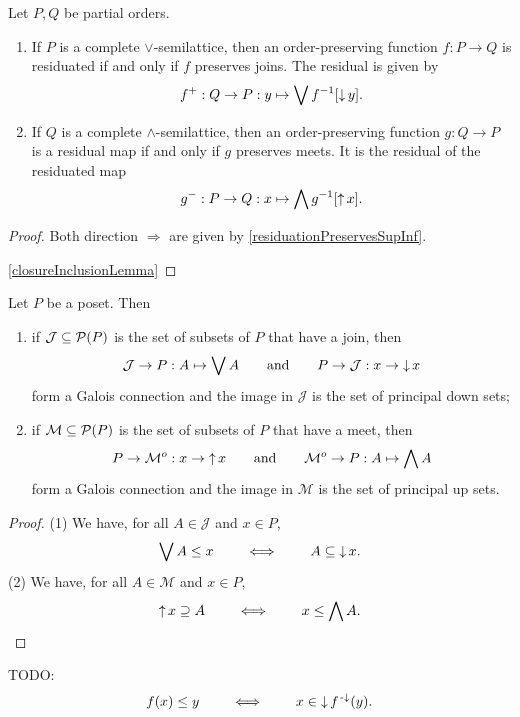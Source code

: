 \begin{proposition} \label{GaloisConnectionLatticePreservation}
Let $P, Q$ be partial orders.
\begin{enumerate}
\item If $P$ is a complete $\vee$-semilattice, then an order-preserving function $f: P\to Q$ is residuated \textup{if and only if} $f$ preserves joins. The residual is given by
\[ f^+: Q\to P: y\mapsto \bigvee f^{-1}[\operatorname{\downarrow} y]. \]
\item If $Q$ is a complete $\wedge$-semilattice, then an order-preserving function $g: Q\to P$ is a residual map \textup{if and only if} $g$ preserves meets. It is the residual of the residuated map
\[ g^-: P\to Q: x\mapsto \bigwedge g^{-1}[\operatorname{\uparrow} x]. \]
\end{enumerate}
\end{proposition}
\begin{proof}
Both direction $\Rightarrow$ are given by \ref{residuationPreservesSupInf}.

\ref{closureInclusionLemma}
\end{proof}



\begin{proposition} \label{upsetDownsetConnections}
Let $P$ be a poset. Then
\begin{enumerate}
\item if $\mathcal{J}\subseteq \operatorname{\mathcal{P}}(P)$ is the set of subsets of $P$ that have a join, then
\[ \mathcal{J} \to P: A\mapsto \bigvee A \qquad\text{and}\qquad P\to \mathcal{J}: x\to \operatorname{\downarrow} x \]
form a Galois connection and the image in $\mathcal{J}$ is the set of principal down sets;
\item if $\mathcal{M}\subseteq \operatorname{\mathcal{P}}(P)$ is the set of subsets of $P$ that have a meet, then
\[ P\to \mathcal{M}^o: x\to \operatorname{\uparrow} x \qquad\text{and}\qquad \mathcal{M}^o \to P: A\mapsto \bigwedge A \]
form a Galois connection and the image in $\mathcal{M}$ is the set of principal up sets. 
\end{enumerate}
\end{proposition}
\begin{proof}
(1) We have, for all $A\in \mathcal{J}$ and $x\in P$,
\[ \bigvee A \leq x \qquad \iff\qquad A\subseteq \operatorname{\downarrow} x. \]
(2) We have, for all $A\in \mathcal{M}$ and $x\in P$,
\[ \operatorname{\uparrow} x \supseteq A \qquad \iff\qquad x\leq \bigwedge A. \]
\end{proof}

TODO:
\[ f(x) \leq y \qquad\iff\qquad x\in \operatorname{\downarrow} f^{{\text{\hspace{0.15em}-}\downarrow}}(y). \]

